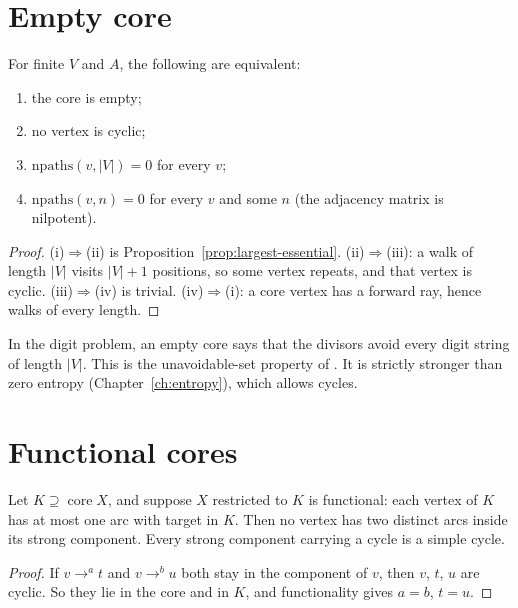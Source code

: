 \section{Empty core}

\begin{theorem}\label{thm:core-empty}
For finite \(V\) and \(A\), the following are equivalent:
\begin{enumerate}[label=(\roman*)]
\item the core is empty;
\item no vertex is cyclic;
\item \(\mathrm{npaths}(v,|V|)=0\) for every \(v\);
\item \(\mathrm{npaths}(v,n)=0\) for every \(v\) and some \(n\) (the adjacency matrix is
  nilpotent).
\end{enumerate}
\end{theorem}

\begin{proof}
(i)\(\Rightarrow\)(ii) is Proposition~\ref{prop:largest-essential}. (ii)\(\Rightarrow\)(iii):
a walk of length \(|V|\) visits \(|V|+1\) positions, so some vertex repeats, and that vertex
is cyclic. (iii)\(\Rightarrow\)(iv) is trivial. (iv)\(\Rightarrow\)(i): a core vertex has a
forward ray, hence walks of every length.
\end{proof}

In the digit problem, an empty core says that the divisors avoid every digit string of length
\(|V|\). This is the unavoidable-set property of \cite{DubOst06}. It is strictly stronger than
zero entropy (Chapter~\ref{ch:entropy}), which allows cycles.

\section{Functional cores}\label{sec:functional-core}

\begin{proposition}\label{prop:functional-core}
Let \(K\supseteq\operatorname{core}X\), and suppose \(X\) restricted to \(K\) is functional: each
vertex of \(K\) has at most one arc with target in \(K\). Then no vertex has two distinct arcs
inside its strong component. Every strong component carrying a cycle is a simple cycle.
\end{proposition}

\begin{proof}
If \(v\to^a t\) and \(v\to^b u\) both stay in the component of \(v\), then \(v\), \(t\), \(u\)
are cyclic. So they lie in the core and in \(K\), and functionality gives \(a=b\), \(t=u\).
\end{proof}

